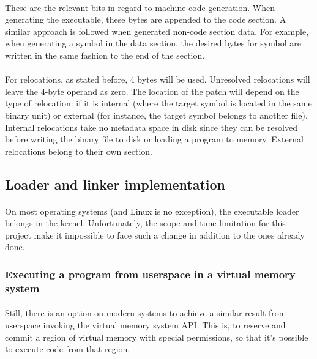 \documentclass[12pt]{article}
\begin{document}
	\paragraph{}These are the relevant bits in regard to machine code generation. When generating the executable, these bytes are appended to the code section. A similar approach is followed when generated non-code section data. For example, when generating a symbol in the data section, the desired bytes for symbol are written in the same fashion to the end of the section.
	\paragraph{}For relocations, as stated before, 4 bytes will be used. Unresolved relocations will leave the 4-byte operand as zero. The location of the patch will depend on the type of relocation: if it is internal (where the target symbol is located in the same binary unit) or external (for instance, the target symbol belongs to another file). Internal relocations take no metadata space in disk since they can be resolved before writing the binary file to disk or loading a program to memory. External relocations belong to their own section.
	
	\subsection{Loader and linker implementation}
	
	\paragraph{} On most operating systems (and Linux is no exception), the executable loader belongs in the kernel. Unfortunately, the scope and time limitation for this project make it impossible to face such a 
	change in addition to the ones already done.
	
	\subsubsection{Executing a program from userspace in a virtual memory system}
	\paragraph{}Still, there is an option on modern systems to achieve a similar result from userspace invoking the virtual memory system API. This is, to reserve and commit a region of virtual memory with special permissions, so that it's possible to execute code from that region.
\end{document}
